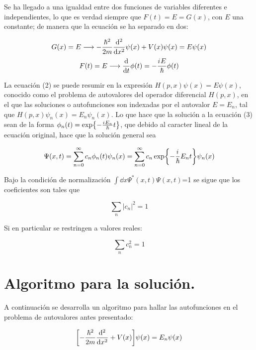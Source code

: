 \documentclass{article}
\newcommand{\iu}{{i\mkern1mu}}
\begin{document}
Se ha llegado a una igualdad entre dos funciones de variables diferentes e independientes, lo que es verdad siempre que $F(t)=E=G(x)$, con $E$ una constante; de manera que la ecuación se ha separado en dos:

\begin{equation}
    G(x)=E \longrightarrow -\frac{\hbar^2}{2m}\dv[2]{x}\psi(x)+V(x)\psi(x)=E\psi(x)
\end{equation}
\begin{equation}
    F(t)=E \longrightarrow \dv{t}\phi(t)=-\frac{\iu E}{\hbar}\phi(t)
\end{equation}

La ecuación (2) se puede resumir en la expresión $H(p,x)\psi(x)=E\psi(x)$, conocido como el problema de autovalores del operador diferencial $H(p,x)$, en el que las soluciones o autofunciones son indexadas por el autovalor $E=E_n$, tal que $H(p,x)\psi_n(x)=E_n\psi_n(x)$. Lo que hace que la solución a la ecuación (3) sean de la forma $\phi_n(t)=\exp{-\frac{\iu E_n}{\hbar}t}$, que debido al caracter lineal de la ecuación original, hace que la solución general sea

\begin{equation}
    \Psi(x,t)=\sum_{n=0}^{\infty}c_n\phi_n(t)\psi_n(x)=\sum_{n=0}^{\infty}c_n\exp{-\frac{\iu}{\hbar}E_n t}\psi_n(x)
\end{equation}

Bajo la condición de normalización $\int\dd{x}\Psi^{*}(x,t)\Psi(x,t)$=1 se sigue que los coeficientes son tales que

\begin{equation*}
    \sum_{n}|c_n|^2=1
\end{equation*}

Si en particular se restringen a valores reales:

\begin{equation}
    \sum_{n}c_n^2=1
\end{equation}

\section{Algoritmo para la solución.}

A continuación se desarrolla un algoritmo para hallar las autofunciones en el problema de autovalores antes presentado:

\begin{equation*}
    \qty[-\frac{\hbar^2}{2m}\dv[2]{x}+V(x)]\psi(x)=E_n\psi(x)
\end{equation*}
\end{document}
